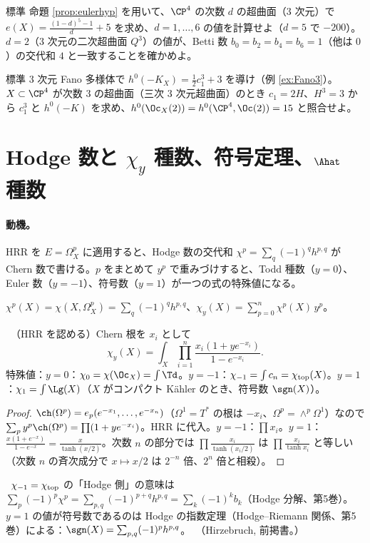 
\begin{prob}{標準}\label{p:eulerhyp}
命題 \ref{prop:eulerhyp} を用いて、$\CP^4$ の次数 $d$ の超曲面（3 次元）で $e(X)=\frac{(1-d)^5-1}d+5$ を求め、$d=1,\dots,6$ の値を計算せよ（$d=5$ で $-200$）。$d=2$（3 次元の二次超曲面 $Q^3$）の値が、Betti 数 $b_0=b_2=b_4=b_6=1$（他は $0$）の交代和 $4$ と一致することを確かめよ。
\end{prob}

\begin{prob}{標準}\label{p:Fano3}
3 次元 Fano 多様体で $h^0(-K_X)=\frac12c_1^3+3$ を導け（例 \ref{ex:Fano3}）。$X\subset\CP^4$ が次数 3 の超曲面（三次 3 次元超曲面）のとき $c_1=2H$、$H^3=3$ から $c_1^3$ と $h^0(-K)$ を求め、$h^0(\Oc_X(2))=h^0(\CP^4,\Oc(2))=15$ と照合せよ。
\end{prob}
\section{Hodge 数と $\chi_y$ 種数、符号定理、$\Ahat$ 種数}\label{sec:chiy}
\paragraph{動機。}HRR を $E=\Omega^p_X$ に適用すると、Hodge 数の交代和 $\chi^p=\sum_q(-1)^qh^{p,q}$ が Chern 数で書ける。$p$ をまとめて $y^p$ で重みづけすると、Todd 種数（$y=0$）、Euler 数（$y=-1$）、符号数（$y=1$）が一つの式の特殊値になる。
\begin{defn}[$\chi_y$ 種数]
$\chi^p(X)=\chi(X,\Omega^p_X)=\sum_{q}(-1)^qh^{p,q}$、$\chi_y(X)=\sum_{p=0}^n\chi^p(X)\,y^p$。
\end{defn}
\begin{thm}[Hirzebruch]\label{thm:chiy}\tP\ （HRR を認める）Chern 根を $x_i$ として
\[
\chi_y(X)=\int_X\prod_{i=1}^n\frac{x_i(1+ye^{-x_i})}{1-e^{-x_i}}.
\]
特殊値：$y=0$：$\chi_0=\chi(\Oc_X)=\int\Td$。$y=-1$：$\chi_{-1}=\int c_n=\chi_{\rm top}(X)$。$y=1$：$\chi_1=\int\Lg(X)$（$X$ がコンパクト Kähler のとき、符号数 $\sgn(X)$）。
\end{thm}
\begin{proof}
$\ch(\Omega^p)=e_p(e^{-x_1},\dots,e^{-x_n})$（$\Omega^1=T^*$ の根は $-x_i$、$\Omega^p=\wedge^p\Omega^1$）なので $\sum_py^p\ch(\Omega^p)=\prod(1+ye^{-x_i})$。HRR に代入。$y=-1$：$\prod x_i$。$y=1$：$\frac{x(1+e^{-x})}{1-e^{-x}}=\frac x{\tanh(x/2)}$。次数 $n$ の部分では $\prod\frac{x_i}{\tanh(x_i/2)}$ は $\prod\frac{x_i}{\tanh x_i}$ と等しい（次数 $n$ の斉次成分で $x\mapsto x/2$ は $2^{-n}$ 倍、$2^n$ 倍と相殺）。\qedhere
\end{proof}
\noindent \tC\ $\chi_{-1}=\chi_{\rm top}$ の「Hodge 側」の意味は $\sum_p(-1)^p\chi^p=\sum_{p,q}(-1)^{p+q}h^{p,q}=\sum_k(-1)^kb_k$（Hodge 分解、第5巻）。$y=1$ の値が符号数であるのは Hodge の指数定理（Hodge--Riemann 関係、第5巻）による：$\sgn(X)=\sum_{p,q}(-1)^ph^{p,q}$。\tC\ （Hirzebruch, 前掲書。）

